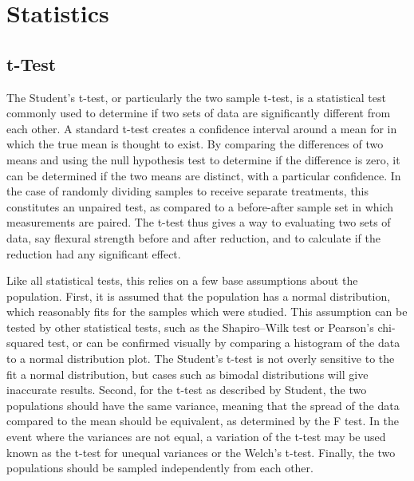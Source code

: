 

\chapter{Statistics}

\section{t-Test}
    \label{app:ttest}
    The Student's t-test, or particularly the two sample t-test, is a statistical test commonly used to determine if two sets of data are significantly different from each other.
    A standard t-test creates a confidence interval around a mean for in which the true mean is thought to exist.
    By comparing the differences of two means and using the null hypothesis test to determine if the difference is zero, it can be determined if the two means are distinct, with a particular confidence.
    In the case of randomly dividing samples to receive separate treatments, this constitutes an unpaired test, as compared to a before-after sample set in which measurements are paired.
    The t-test thus gives a way to evaluating two sets of data, say flexural strength before and after reduction, and to calculate if the reduction had any significant effect.

    Like all statistical tests, this relies on a few base assumptions about the population.
    First, it is assumed that the population has a normal distribution, which reasonably fits for the samples which were studied.
    This assumption can be tested by other statistical tests, such as the Shapiro–Wilk test or Pearson's chi-squared test, or can be confirmed visually by comparing a histogram of the data to a normal distribution plot.
    The Student's t-test is not overly sensitive to the fit a normal distribution, but cases such as bimodal distributions will give inaccurate results.
    Second, for the t-test as described by Student, the two populations should have the same variance, meaning that the spread of the data compared to the mean should be equivalent, as determined by the F test.
    In the event where the variances are not equal, a variation of the t-test may be used known as the t-test for unequal variances or the Welch's t-test.
    Finally, the two populations should be sampled independently from each other.

